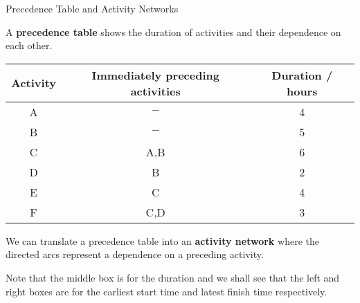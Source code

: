 \documentclass[8pt]{beamer}
\def\height{0.8cm}
\def\width{1.2cm}
\newcommand{\keynode}[6]{\node[minimum height=\height,minimum width=\width,draw,rectangle,color=aa,fill=cc] (#3) at (#1,#2) {};
	\node[rectangle,minimum height=\height/2,minimum width=\width,above,color=aa,fill=cc] at (#3) {#3};
	\node[draw,rectangle,minimum height=\height/2,minimum width=\width/3,below,color=aa,fill=cc,inner sep =0cm] at (#3) {\footnotesize#4};
	\node[draw,rectangle,minimum height=\height/2,minimum width=\width/3,below,xshift=\height/2,color=aa,fill=cc,inner sep=0cm] at (#3) {\footnotesize#5};
	\node[draw,rectangle,minimum height=\height/2,minimum width=\width/3,below,xshift=-\height/2,color=aa,fill=cc,inner sep=0cm] at (#3) {\footnotesize#6}; }
\begin{document}
\begin{frame}[allowframebreaks]{Precedence Table and Activity Networks}

\begin{definition}
	A \textbf{precedence table} shows the duration of activities and their dependence on each other. 
\end{definition}

\begin{center}
	\colorbox{cc!30}{
		\setlength\arrayrulewidth{0.5mm}
		\begin{tabular}{ccc}
			Activity & Immediately preceding activities & Duration / hours \\
			\hline
			A &  $-$ & 4 \\
			B &  $-$ & 5 \\
			C &  A,B & 6 \\
			D &  B & 2 \\
			E &  C & 4 \\
			F &  C,D & 3 \\
		\end{tabular}
	}
	
\end{center}

\begin{definition}
	We can translate a precedence table into an \textbf{activity network} where the directed arcs represent a dependence on a preceding activity. 
	
\end{definition}


\begin{center}
\end{center}

\alert{Note that the middle box is for the duration and we shall see that the left and right boxes are for the earliest start time and latest finish time respectively.}
	
\end{frame}
\end{document}
